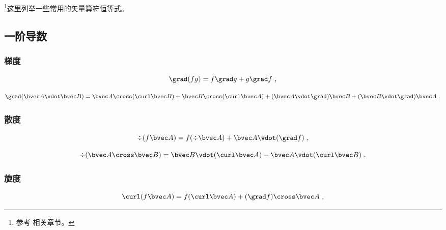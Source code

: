 
\begin{issues}
\issueAbstract
\end{issues}



\footnote{参考 \cite{GriffE} 相关章节。}这里列举一些常用的矢量算符恒等式。

\subsection{一阶导数}
\subsubsection{梯度}
\begin{equation}\label{eq_VopEq_2}
\grad (fg) = f\grad g + g \grad f~,
\end{equation}

\begin{equation}
\grad (\bvec A \vdot \bvec B) = \bvec A \cross (\curl \bvec B) + \bvec B \cross (\curl \bvec A) + (\bvec A \vdot \grad) \bvec B + (\bvec B \vdot \grad) \bvec A~.
\end{equation}

\subsubsection{散度}

\begin{equation}\label{eq_VopEq_1}
\div (f \bvec A) = f (\div \bvec A) + \bvec A \vdot (\grad f)~,
\end{equation}

\begin{equation}\label{eq_VopEq_4}
\div (\bvec A \cross \bvec B) = \bvec B \vdot (\curl \bvec A) - \bvec A \vdot (\curl \bvec B)~.
\end{equation}

\subsubsection{旋度}
\begin{equation}\label{eq_VopEq_3}
\curl(f\bvec A) = f (\curl\bvec A) + (\grad f) \cross\bvec A~,
\end{equation}

